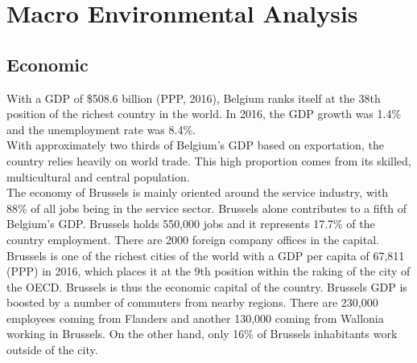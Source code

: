 \documentclass[12pt,a4paper,oneside]{book}
\begin{document}
\section{Macro Environmental Analysis}

\subsection{Economic}


With a GDP of \$508.6 billion (PPP, 2016), Belgium ranks itself at the 38th position of the richest country in the world. In 2016, the GDP growth was 1.4\% and the unemployment rate was 8.4\%.\\

With approximately two thirds of Belgium's GDP based on exportation, the country relies heavily on world trade. This high proportion comes from its skilled, multicultural and central population.\cite{ciafb}\\

The economy of Brussels is mainly oriented around the service industry, with 88\% of all jobs being in the service sector. Brussels alone contributes to a fifth of Belgium's GDP. Brussels holds 550,000 jobs and it represents 17.7\% of the country employment. There are 2000 foreign company offices in the capital.\cite{bxinfo}\\

Brussels is one of the richest cities of the world with a GDP per capita of 67,811 (PPP) in 2016, which places it at the 9th position within the raking of the city of the OECD.\cite{oecdstat} Brussels is thus the economic capital of the country. Brussels GDP is boosted by a number of commuters from nearby regions. There are 230,000 employees coming from Flanders and another 130,000 coming from Wallonia working in Brussels. On the other hand, only 16\% of Brussels inhabitants work outside of the city.\cite{euresCom}\\
\end{document}
